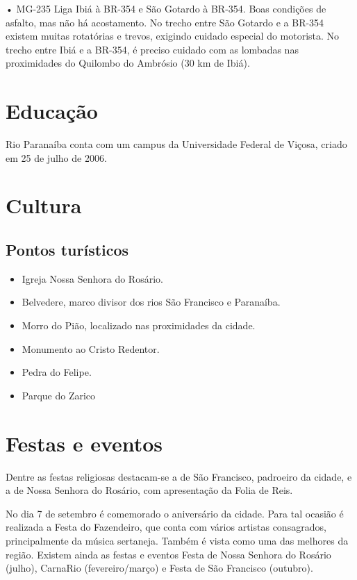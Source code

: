 \documentclass[
	12pt,				    %
	openright,			    %
	oneside,			    %
	a4paper,			    %
    sumario=tradicional,    %
	english,			    %
	brazil,				    %
	]{abntex2}              %
\begin{document}
•	MG-235
Liga Ibiá à BR-354 e São Gotardo à BR-354. Boas condições de asfalto, mas não há acostamento. No trecho entre São Gotardo e a BR-354 existem muitas rotatórias e trevos, exigindo cuidado especial do motorista. No trecho entre Ibiá e a BR-354, é preciso cuidado com as lombadas nas proximidades do Quilombo do Ambrósio (30 km de Ibiá).

\section{Educação}

Rio Paranaíba conta com um campus da Universidade Federal de Viçosa, criado em 25 de julho de 2006.

\section{Cultura}

\subsection{Pontos turísticos}

\begin{itemize}


    \item	Igreja Nossa Senhora do Rosário.
    \item Belvedere, marco divisor dos rios São Francisco e Paranaíba.
    \item	Morro do Pião, localizado nas proximidades da cidade.
    \item	Monumento ao Cristo Redentor.
    \item	Pedra do Felipe.
    \item	Parque do Zarico

\end{itemize}
\section{Festas e eventos}

Dentre as festas religiosas destacam-se a de São Francisco, padroeiro da cidade, e a de Nossa Senhora do Rosário, com apresentação da Folia de Reis.

No dia 7 de setembro é comemorado o aniversário da cidade. Para tal ocasião é realizada a Festa do Fazendeiro, que conta com vários artistas consagrados, principalmente da música sertaneja. Também é vista como uma das melhores da região. Existem ainda as festas e eventos Festa de Nossa Senhora do Rosário (julho), CarnaRio (fevereiro/março) e Festa de São Francisco (outubro).
\end{document}
